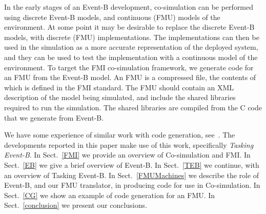 \documentclass{llncs}%
\begin{document}
In the early stages of an Event-B development, co-simulation can be performed using discrete Event-B models, and continuous (FMU) models of the environment. At some point it may be desirable to replace the discrete Event-B models, with discrete (FMU) implementations. The implementations can then be used in the simulation as a more accurate representation of the deployed system, and they can be used to test the implementation with a continuous model of the environment. To target the FMI co-simulation framework, we generate code for an FMU from the Event-B model. An FMU is a compressed file, the contents of which is defined in the FMI standard. The FMU should contain an XML description of the model being simulated, and include the shared libraries required to run the simulation. The shared libraries are compiled from the C code that we generate from Event-B.

We have some experience of similar work with code generation, see~\cite{ae2012b,Edmunds2008,ae2011a}. The developments reported in this paper make use of this work, specifically \emph{Tasking Event-B}. 
%
In Sect.~\ref{FMI} we provide an overview of Co-simulation and FMI.
%
In Sect.~\ref{EB} we give a brief overview of Event-B.
%
In Sect.~\ref{TEB} we continue, with an overview of Tasking Event-B. 
%
In Sect.~\ref{FMUMachines} we describe the role of Event-B, and our FMU translator, in producing code for use in Co-simulation. 
%
In Sect.~\ref{CG} we show an example of code generation for an FMU.
%
%
% 
In Sect.~\ref{conclusion} we present our conclusions.
%
%
\end{document}
